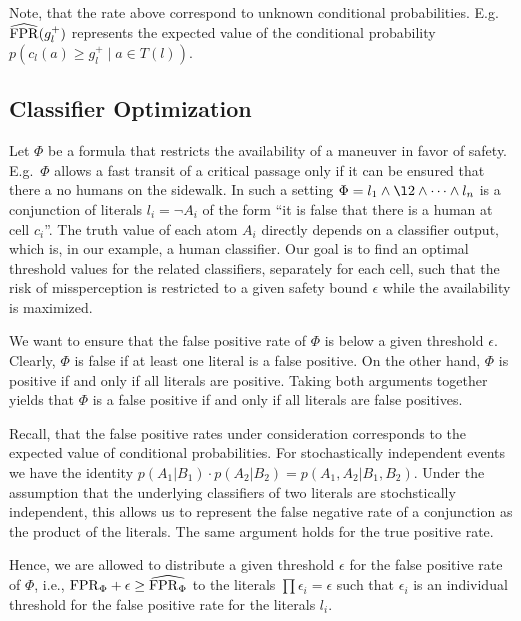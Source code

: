 Note, that the rate above correspond to unknown conditional probabilities. E.g.\
$\widehat{\mathrm{FPR}}(g_l^+)$ represents the expected value of the conditional probability $p( c_l(a)\geq g_l^+ \mid a\in T(l))$.

\subsection{Classifier Optimization}
Let $\Phi$ be a formula that restricts the availability of a maneuver in favor of safety. 
E.g.\ $\Phi$ allows a fast transit of a critical passage only if it can be ensured that there a no humans on the sidewalk. In such a setting $\Phi = l_1 \land \l2 \land \dots \land l_n$ is a conjunction of literals $l_i=\lnot A_i$ of the form ``it is false that there is a human at cell $c_i$''. The truth value of each atom $A_i$ directly depends on a classifier output, which is, in our example, a human classifier. Our goal is to find an optimal threshold values for the related classifiers, separately for each cell,
such that the risk of missperception is restricted to a given safety bound
$\epsilon$ while the availability is maximized.

We want to ensure that the false positive rate of $\Phi$ is below a
given threshold $\epsilon$. Clearly, $\Phi$ is false if at least one literal
is a false positive. On the other hand, $\Phi$ is positive if and only if
all literals are positive. Taking both arguments together yields that
$\Phi$ is a false positive if and only if all literals are false positives.

Recall, that the false positive rates under consideration corresponds
to the expected value of conditional probabilities.
For stochastically independent events we have the identity 
$p(A_1|B_1)\cdot p(A_2|B_2) = p(A_1,A_2|B_1,B_2)$. Under the assumption that
the underlying classifiers of two literals are stochstically independent,
this allows us to represent the false negative rate of a conjunction as the
product of the literals. The same argument holds for the true positive rate.

Hence, we are allowed to distribute a given threshold $\epsilon$ for the
false positive rate of $\Phi$, i.e., $\mathrm{FPR}_\Phi+\epsilon\geq\widehat{\mathrm{FPR}_\Phi}$ to the literals $\prod\epsilon_i = \epsilon$ such that $\epsilon_i$
is an individual threshold for the false positive rate for the literals $l_i$.

%



